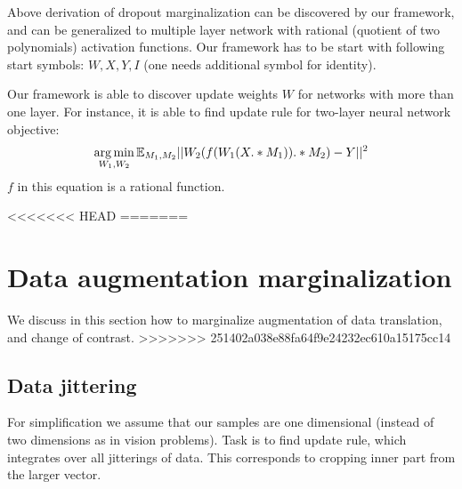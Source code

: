 Above derivation of dropout marginalization can be discovered by our framework, and can be generalized
to multiple layer network with rational (quotient of two polynomials) activation functions. Our framework
has to be start with following start symbols: $W, X, Y, I$ (one needs additional symbol for identity).


Our framework is able to discover update weights $W$ for networks with more than one layer. 
For instance, it is able to find update rule for two-layer neural network objective:
\begin{equation*}
  \operatorname*{arg\,min}_{W_1, W_2} \mathbb{E}_{M_1, M_2} ||W_2(f(W_1(X .* M_1)) .* M_2) - Y||^2
\end{equation*}
$f$ in this equation is a rational function. 


<<<<<<< HEAD
=======
\section{Data augmentation marginalization}\label{sec:augm}
We discuss in this section how to marginalize augmentation of data translation, and change of contrast. 
>>>>>>> 251402a038e88fa64f9e24232ec610a15175cc14

\subsection{Data jittering}
For simplification we assume that our samples are one dimensional (instead of two dimensions as in
vision problems). Task is to find update rule, which integrates over all jitterings of data. This
corresponds to cropping inner part from the larger vector.

